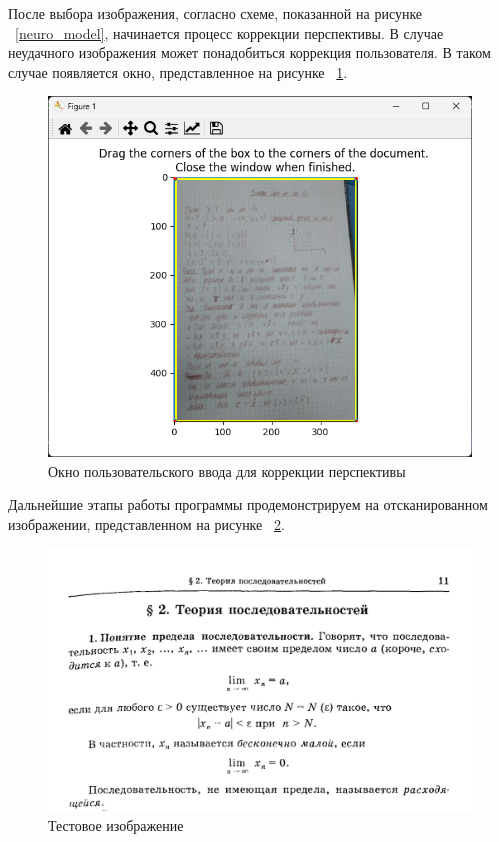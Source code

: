 После выбора изображения, согласно схеме, показанной на рисунке ~\ref{neuro_model}, начинается процесс коррекции перспективы. В случае неудачного изображения может понадобиться коррекция пользователя. В таком случае появляется окно, представленное на рисунке ~\ref{perspective_correction_window}.

\begin{figure}
    \includegraphics[scale=0.75]{img/app/perspective_correction_window.png}
    \caption{Окно пользовательского ввода для коррекции перспективы}
    \label{perspective_correction_window}
\end{figure}

Дальнейшие этапы работы программы продемонстрируем на отсканированном изображении, представленном на рисунке ~\ref{test_input}.

\begin{figure}
    \includegraphics[scale=0.75]{img/app/input_image.jpg}
    \caption{Тестовое изображение}
    \label{test_input}
\end{figure}

